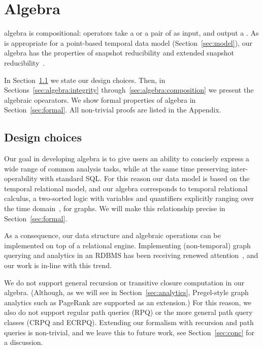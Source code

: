 \section{Algebra}
\label{sec:algebra}
\setlength{\textfloatsep}{5pt}%

\tg algebra is compositional: operators take a \tg or a pair of \tgs
as input, and output a \tg.  As is appropriate for a point-based
temporal data model (Section~\ref{sec:model}), our algebra has the
properties of snapshot reducibility and extended snapshot
reducibility~\cite{DBLP:reference/db/Bohlen092}.

In Section~\ref{sec:algebra:prelim} we state our design choices.
Then, in Sections~\ref{sec:algebra:integrity}
through~\ref{sec:algebra:composition} we present the algebraic
opearators.  We show formal properties of \tg algebra in
Section~\ref{sec:formal}.  All non-trivial proofs are listed in the
Appendix.

\subsection{Design choices}
\label{sec:algebra:prelim}

Our goal in developing \tg algebra is to give users an ability to
concisely express a wide range of common analysis tasks, while at the
same time preserving inter-operability with standard SQL.  For this
reason our data model is based on the temporal relational model, and
our algebra corresponds to temporal relational calculus, a two-sorted
logic with variables and quantifiers explicitly ranging over the time
domain~\cite{DBLP:reference/db/Toman09}, for graphs.  We will make
this relationship precise in Section~\ref{sec:formal}.

As a consequence, our data structure and algebraic operations can be
implemented on top of a relational engine.  Implementing
(non-temporal) graph querying and analytics in an RDBMS has been
receiving renewed
attention~\cite{DBLP:conf/sigmod/AbergerTOR16,DBLP:conf/sigmod/SunFSKHX15,DBLP:journals/pvldb/Xirogiannopoulos15},
and our work is in-line with this trend.

We do not support general recursion or transitive closure
computation in our algebra. (Although, as we will see in
Section~\ref{sec:analytics}, Pregel-style graph analytics such as
PageRank are supported as an extension.)  For this reason, we also do
not support regular path queries (RPQ) or the more general path query
classes (CRPQ and ECRPQ).  Extending our formalism with recursion and
path queries is non-trivial, and we leave this to future work, see
Section~\ref{sec:conc} for a discussion.

